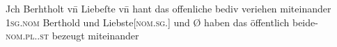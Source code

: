 \begin{exe}
\ex \label{ex:vvfinctrl}


		\gll Jch Berhtholt vn̄ Liebeſte \textelp{} vn̄ {} hant das offenliche
				bediv veriehen miteinander \\
			\textsc{1sg\subM.nom} Berthold und Liebste[\textsc{nom.sg.\FemF}]
				{} und Ø\subMF{} haben das öffentlich
				beide-\textsc{nom.pl.\NeutMF.st} bezeugt miteinander \\
		\trans {}
			\parencites(Nr.~N~150, Kl.~Niedermünster, Dépt.~Bas-Rhin, 1277)[108,31--32]{cao5}

\end{exe}


